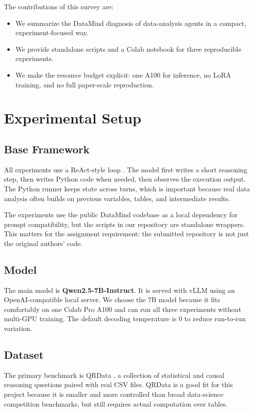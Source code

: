 \documentclass[11pt]{article}
\begin{document}
The contributions of this survey are:
\begin{itemize}
    \item We summarize the DataMind diagnosis of data-analysis agents in a compact, experiment-focused way.
    \item We provide standalone scripts and a Colab notebook for three reproducible experiments.
    \item We make the resource budget explicit: one A100 for inference, no LoRA training, and no full paper-scale reproduction.
\end{itemize}

\section{Experimental Setup}

\subsection{Base Framework}

All experiments use a ReAct-style loop \citep{yao2023react}.
The model first writes a short reasoning step, then writes Python code when needed, then observes the execution output.
The Python runner keeps state across turns, which is important because real data analysis often builds on previous variables, tables, and intermediate results.

The experiments use the public DataMind codebase as a local dependency for prompt compatibility, but the scripts in our repository are standalone wrappers.
This matters for the assignment requirement: the submitted repository is not just the original authors' code.

\subsection{Model}

The main model is \textbf{Qwen2.5-7B-Instruct}.
It is served with vLLM using an OpenAI-compatible local server.
We choose the 7B model because it fits comfortably on one Colab Pro A100 and can run all three experiments without multi-GPU training.
The default decoding temperature is 0 to reduce run-to-run variation.

\subsection{Dataset}

The primary benchmark is QRData \citep{liu2024qrdata}, a collection of statistical and causal reasoning questions paired with real CSV files.
QRData is a good fit for this project because it is smaller and more controlled than broad data-science competition benchmarks, but still requires actual computation over tables.
\end{document}
